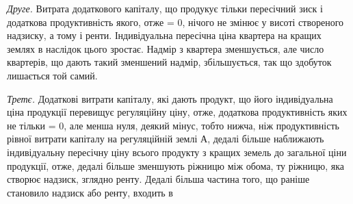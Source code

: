 \emph{Друге.} Витрата додаткового капіталу, що продукує тільки пересічний
зиск і додаткова продуктивність якого, отже = 0, нічого не змінює у висоті
створеного надзиску, а тому і ренти. Індивідуальна пересічна ціна квартера на
кращих землях в наслідок цього зростає. Надмір з квартера зменшується, але
число квартерів, що дають такий зменшений надмір, збільшується, так що здобуток
лишається той самий.

\emph{Третє.} Додаткові витрати капіталу, які дають продукт, що його індивідуальна
ціна продукції перевищує регуляційну ціну, отже, додаткова продуктивність
яких не тільки = 0, але менша нуля, деякий мінус, тобто нижча,
ніж продуктивність рівної витрати капіталу на регуляційній землі А, дедалі
більше наближають індивідуальну пересічну ціну всього продукту з кращих
земель до загальної ціни продукції, отже, дедалі більше зменшують ріжницю
між обома, ту ріжницю, яка створює надзиск, зглядно ренту. Дедалі
більша частина того, що раніше становило надзиск або ренту, входить в
\parbreak{}  %
